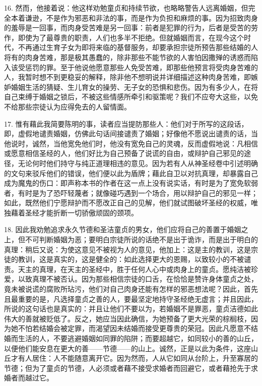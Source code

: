 16. 然而，他接着说：他这样劝勉童贞和持续节欲，也略略警告人远离婚姻，但完全本着谦逊，不是作为邪恶和非法的事，而是作为负担和麻烦的事。因为招致肉身的羞辱是一回事，而肉身受苦难是另一回事：前者是犯罪的行为，后者是受苦的劳作，即使为了最尊贵的职责，人们也多半不拒绝。但就婚姻而言，在现今这个时代，不再通过生育子女为即将来临的基督服务，却要承担宗徒所预告那些结婚的人将有的肉身苦难，那是极其愚蠢的，除非那些不能节欲的人害怕因撒殚的诱惑而陷入该受惩罚的罪。至于他说他愿意那些人免受苦难，即那些他预言将受肉身苦难的人，我暂时想不到更稳妥的解释，除非他不想明说并详细描述这种肉身苦难，即嫉妒婚姻生活的猜疑、生儿育女的操劳、无子女的恐惧和悲伤。因为有多少人，在将自己束缚于婚姻之锁后，不被这些情感所牵引和驱策呢？我们不应夸大这些，以免不给那些宗徒认为应得免去的人留情面。\par

17. 惟有藉此我简要陈明的事，读者应当提防那些人：他们对于所写的这段话，即，虚假地谴责婚姻，仿佛此句话间接谴责了婚姻；好像他不愿说出谴责的话，当他说时，诚然，当他宽免他们时，他没有宽免自己的灵魂，反而虚假地说：凡相信或愿意相信圣经的人，他们好比为自己预备了说谎的自由，或辩护自己邪见的途径，无论何时他们持守与纯正道理相违的意见。因为若有人从神圣经卷中引述明确的文句来驳斥他们的错误，他们便以此为盾牌；藉此自卫以对抗真理，却暴露自己成为魔鬼的伤口：即声称本书的作者在这一点上没有说实话，有时是为了宽免软弱者，有时是为了恐吓轻蔑者；就像碰巧遇到一个场合，用以辩护自己的邪见一样；如此，既然他们宁愿辩护而不愿改正自己的见解，他们就试图破坏圣经的权威，唯独藉着圣经才能折断一切骄傲顽固的颈项。\par

18. 因此我劝勉追求永久节德和圣洁童贞的男女，他们应将自己的善置于婚姻之上，但不可判断婚姻为恶；要明白宗徒所说的话绝不是出于诡诈，而是出于明白的真理：稍后又说：为使这意见不被视为人的意见，他加上：这是主的教训，这是宗徒的教训，这是真实的，这是健全的：如此选择更大的恩赐，以致较小的不被谴责。天主的真理，在天主的圣经中，胜于任何人心中或肉身上的童贞。愿纯洁被珍爱，以致真理不被否认。因为那些相信宗徒的口舌，在恰恰是赞许身体童贞之处，竟未被说谎的腐败所玷污，他们对自己肉身还能有怎样的邪恶想法呢？因此，首先且最重要的是，凡选择童贞之善的人，要最坚定地持守圣经绝无虚言；并且因此，所说的这句话也是真实的：并且让他们不要以为，若婚姻不是罪恶，童贞洁德如此伟大的善就被贬低了。反之，她应当因此确信，为她预备了更大光荣的棕榈枝，因为她不怕若结婚会被定罪，而渴望因未结婚而接受更尊贵的荣冠。因此凡愿意不结婚而生活的人，不要逃避婚姻如同罪的陷阱；而要超越它，如同较小的善的山丘，以便他们能安息在更大的善——节德——的山上。诚然，正是以此为条件，这座山丘才有人居住：人不能随意离开它。因为然而，人从它如同从台阶上，升至寡居的节德；但为了童贞的节德，人必须或者藉不接受求婚者而回避它，或者藉抢先于求婚者而越过它。\par

